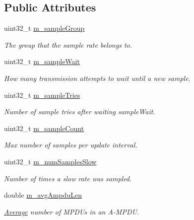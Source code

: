 \subsection*{Public Attributes}
\begin{DoxyCompactItemize}
\item 
uint32\+\_\+t \hyperlink{structns3_1_1MinstrelHtWifiRemoteStation_a2c76c02fd0fa72e21d633bcfac23026f}{m\+\_\+sample\+Group}
\begin{DoxyCompactList}\small\item\em The group that the sample rate belongs to. \end{DoxyCompactList}\item 
uint32\+\_\+t \hyperlink{structns3_1_1MinstrelHtWifiRemoteStation_a89693de90690a2254cc6800df2cae538}{m\+\_\+sample\+Wait}
\begin{DoxyCompactList}\small\item\em How many transmission attempts to wait until a new sample. \end{DoxyCompactList}\item 
uint32\+\_\+t \hyperlink{structns3_1_1MinstrelHtWifiRemoteStation_a2f7054322b509ec266a17902be8a9aaa}{m\+\_\+sample\+Tries}
\begin{DoxyCompactList}\small\item\em Number of sample tries after waiting sample\+Wait. \end{DoxyCompactList}\item 
uint32\+\_\+t \hyperlink{structns3_1_1MinstrelHtWifiRemoteStation_a133597f95006c5cec893bc307db11034}{m\+\_\+sample\+Count}
\begin{DoxyCompactList}\small\item\em Max number of samples per update interval. \end{DoxyCompactList}\item 
uint32\+\_\+t \hyperlink{structns3_1_1MinstrelHtWifiRemoteStation_a25e3883046d5f1dfdb66b05be2e2ec1a}{m\+\_\+num\+Samples\+Slow}
\begin{DoxyCompactList}\small\item\em Number of times a slow rate was sampled. \end{DoxyCompactList}\item 
double \hyperlink{structns3_1_1MinstrelHtWifiRemoteStation_a4c5bfea5207fe998326c535b3899b07f}{m\+\_\+avg\+Ampdu\+Len}
\begin{DoxyCompactList}\small\item\em \hyperlink{classns3_1_1Average}{Average} number of M\+P\+D\+Us in an A-\/\+M\+P\+DU. \end{DoxyCompactList}\item 

\end{DoxyCompactItemize}
